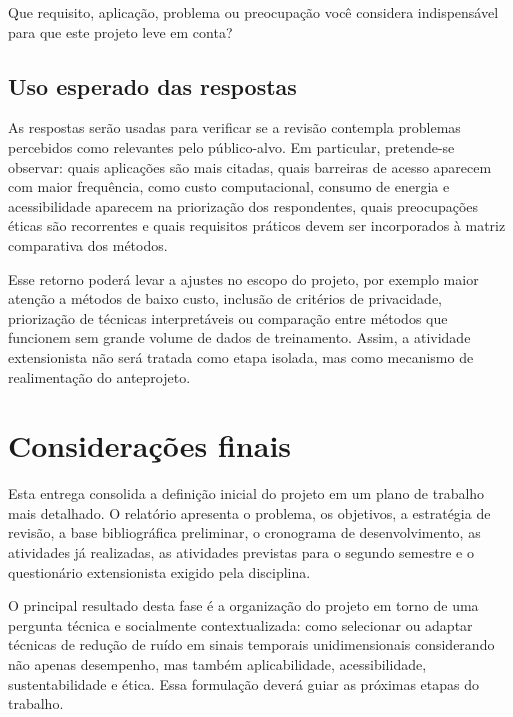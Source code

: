 \newpage


\begin{perguntaFormulario}{Que requisito, aplicação, problema ou preocupação você considera indispensável para que este projeto leve em conta?}
\end{perguntaFormulario}

\newpage

\subsection{Uso esperado das respostas}

As respostas serão usadas para verificar se a revisão contempla problemas percebidos como relevantes pelo público-alvo. Em particular, pretende-se observar: quais aplicações são mais citadas, quais barreiras de acesso aparecem com maior frequência, como custo computacional, consumo de energia e acessibilidade aparecem na priorização dos respondentes, quais preocupações éticas são recorrentes e quais requisitos práticos devem ser incorporados à matriz comparativa dos métodos.

Esse retorno poderá levar a ajustes no escopo do projeto, por exemplo maior atenção a métodos de baixo custo, inclusão de critérios de privacidade, priorização de técnicas interpretáveis ou comparação entre métodos que funcionem sem grande volume de dados de treinamento. Assim, a atividade extensionista não será tratada como etapa isolada, mas como mecanismo de realimentação do anteprojeto.

\section{Considerações finais}

Esta entrega consolida a definição inicial do projeto em um plano de trabalho mais detalhado. O relatório apresenta o problema, os objetivos, a estratégia de revisão, a base bibliográfica preliminar, o cronograma de desenvolvimento, as atividades já realizadas, as atividades previstas para o segundo semestre e o questionário extensionista exigido pela disciplina.

O principal resultado desta fase é a organização do projeto em torno de uma pergunta técnica e socialmente contextualizada: como selecionar ou adaptar técnicas de redução de ruído em sinais temporais unidimensionais considerando não apenas desempenho, mas também aplicabilidade, acessibilidade, sustentabilidade e ética. Essa formulação deverá guiar as próximas etapas do trabalho.


